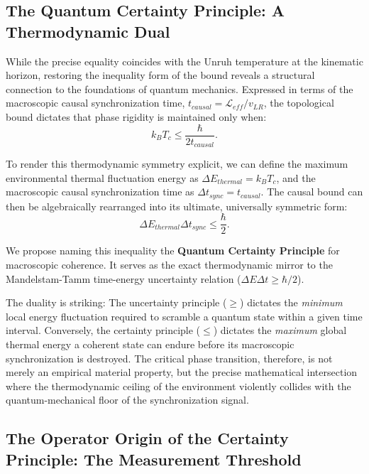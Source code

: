 \documentclass[11pt,a4paper]{article}
\begin{document}
\subsection*{The Quantum Certainty Principle: A Thermodynamic Dual}

While the precise equality coincides with the Unruh temperature at the kinematic horizon, restoring the inequality form of the bound reveals a structural connection to the foundations of quantum mechanics. Expressed in terms of the macroscopic causal synchronization time, $t_{causal} = \mathcal{L}_{eff}/v_{LR}$, the topological bound dictates that phase rigidity is maintained only when:
\begin{equation}
\label{eq:tc_causal}
k_B T_c \le \frac{\hbar}{2 t_{causal}}.
\end{equation}

To render this thermodynamic symmetry explicit, we can define the maximum environmental thermal fluctuation energy as $\Delta E_{thermal} = k_B T_c$, and the macroscopic causal synchronization time as $\Delta t_{sync} = t_{causal}$. The causal bound can then be algebraically rearranged into its ultimate, universally symmetric form:
\begin{equation}
\label{eq:certainty_principle}
\Delta E_{thermal} \Delta t_{sync} \le \frac{\hbar}{2}.
\end{equation}

We propose naming this inequality the \textbf{Quantum Certainty Principle} for macroscopic coherence. It serves as the exact thermodynamic mirror to the Mandelstam-Tamm time-energy uncertainty relation ($\Delta E \Delta t \ge \hbar/2$). 

The duality is striking: The uncertainty principle ($\ge$) dictates the \textit{minimum} local energy fluctuation required to scramble a quantum state within a given time interval. Conversely, the certainty principle ($\le$) dictates the \textit{maximum} global thermal energy a coherent state can endure before its macroscopic synchronization is destroyed. The critical phase transition, therefore, is not merely an empirical material property, but the precise mathematical intersection where the thermodynamic ceiling of the environment violently collides with the quantum-mechanical floor of the synchronization signal.

\subsection*{The Operator Origin of the Certainty Principle: The Measurement Threshold}
\end{document}
